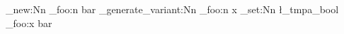 \cs_new:Nn
  \example_foo:n
  { bar }
\cs_generate_variant:Nn
  \example_foo:n
  { x }
\bool_set:Nn
  \l_tmpa_bool
  {
    \example_foo:x  %
      { bar }
  }
